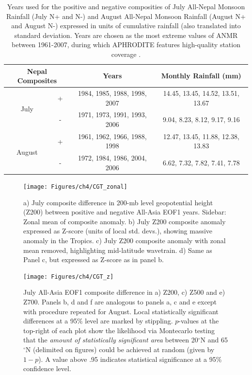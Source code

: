 \begin{table}[p]

\caption{Years used for the positive and negative composities of July All-Nepal Monsoon Rainfall (July N+ and N-) and August All-Nepal Monsoon Rainfall (August N+ and August N-) expressed in units of cumulative rainfall (also translated into standard deviation. Years are chosen as the most extreme values of ANMR between 1961-2007, during which APHRODITE features high-quality station coverage \citep{Day2015}.}
\centering

\begin{tabular}{ c c c c}
	 	 		\multicolumn{2}{c}{Nepal Composites} 	&			Years				&			Monthly Rainfall (mm)		\tabularnewline	
				\hline
	 \multirow{2}{*}{July} 		&  +						&	1984, 1985, 1988, 1998, 2007 	&	14.45, 13.45, 14.52, 13.51, 13.67		\tabularnewline
	 						&  -						&	1971, 1973, 1991, 1993, 2006       &	9.04, 8.23, 8.12, 9.17, 9.16 			\tabularnewline
	 \multirow{2}{*}{August}	&  + 						&	1961, 1962, 1966, 1988, 1998	&	12.47, 13.45, 11.88, 12.38, 13.83		\tabularnewline
	 						&  -  						&	1972, 1984, 1986, 2004, 2006	&	6.62, 7.32, 7.82, 7.41, 7.78			\tabularnewline

\end{tabular}
\label{tab:t41}
\end{table}

\newpage
\clearpage



\begin{figure}
\centering
\noindent\texttt{[image: Figures/ch4/CGT\_zonal]}
\caption{a) July composite difference in 200-mb level geopotential height (Z200) between positive and negative All-Asia EOF1 years. Sidebar: Zonal mean of composite anomaly. b) July Z200 composite anomaly expressed as Z-score (units of local std. devs.), showing massive anomaly in the Tropics. c) July Z200 composite anomaly with zonal mean removed, highlighting mid-latitude wavetrain. d) Same as Panel c, but expressed as Z-score as in panel b.}
\label{fig:cgt_zonal}
\end{figure}

\begin{figure}
\centering
\noindent\texttt{[image: Figures/ch4/CGT\_z]}
\caption{July All-Asia EOF1 composite difference in a) Z200, c) Z500 and e) Z700. Panels b, d and f are analogous to panels a, c and e except with procedure repeated for August. Local statistically significant differences at a 95\% level are marked by stippling. $p$-values at the top-right of each plot show the likelihood via Montecarlo testing that the \textit{amount of statistically significant area} between 20$^{\circ}$N and 65$^{\circ}$N (delimited on figures) could be achieved at random (given by $1-p$). A value above .95 indicates statistical significance at a 95\% confidence level.}
\label{fig:cgt_z}
\end{figure}

